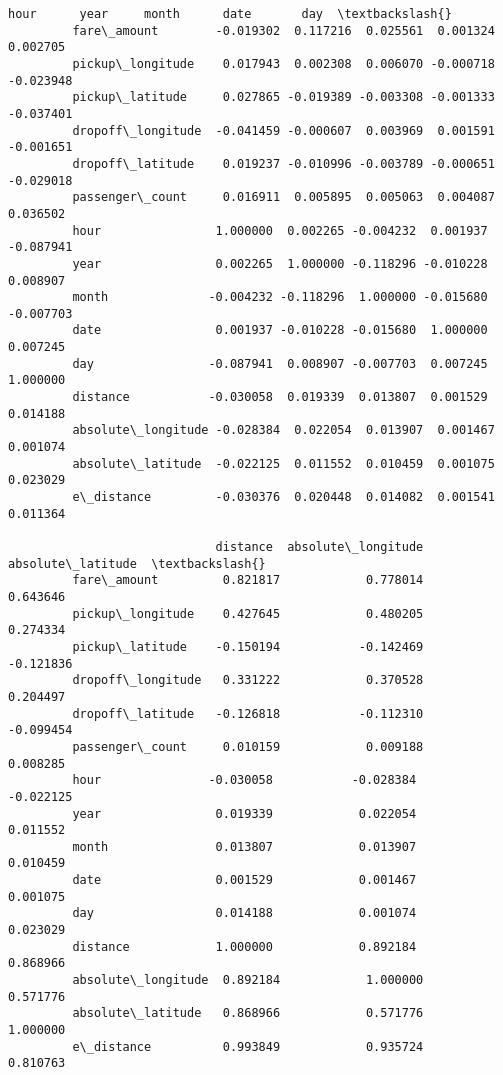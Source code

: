 \documentclass[11pt]{article}
\begin{document}
\begin{Verbatim}[commandchars=\\\{\}]
                                 hour      year     month      date       day  \textbackslash{}
         fare\_amount        -0.019302  0.117216  0.025561  0.001324  0.002705   
         pickup\_longitude    0.017943  0.002308  0.006070 -0.000718 -0.023948   
         pickup\_latitude     0.027865 -0.019389 -0.003308 -0.001333 -0.037401   
         dropoff\_longitude  -0.041459 -0.000607  0.003969  0.001591 -0.001651   
         dropoff\_latitude    0.019237 -0.010996 -0.003789 -0.000651 -0.029018   
         passenger\_count     0.016911  0.005895  0.005063  0.004087  0.036502   
         hour                1.000000  0.002265 -0.004232  0.001937 -0.087941   
         year                0.002265  1.000000 -0.118296 -0.010228  0.008907   
         month              -0.004232 -0.118296  1.000000 -0.015680 -0.007703   
         date                0.001937 -0.010228 -0.015680  1.000000  0.007245   
         day                -0.087941  0.008907 -0.007703  0.007245  1.000000   
         distance           -0.030058  0.019339  0.013807  0.001529  0.014188   
         absolute\_longitude -0.028384  0.022054  0.013907  0.001467  0.001074   
         absolute\_latitude  -0.022125  0.011552  0.010459  0.001075  0.023029   
         e\_distance         -0.030376  0.020448  0.014082  0.001541  0.011364   
         
                             distance  absolute\_longitude  absolute\_latitude  \textbackslash{}
         fare\_amount         0.821817            0.778014           0.643646   
         pickup\_longitude    0.427645            0.480205           0.274334   
         pickup\_latitude    -0.150194           -0.142469          -0.121836   
         dropoff\_longitude   0.331222            0.370528           0.204497   
         dropoff\_latitude   -0.126818           -0.112310          -0.099454   
         passenger\_count     0.010159            0.009188           0.008285   
         hour               -0.030058           -0.028384          -0.022125   
         year                0.019339            0.022054           0.011552   
         month               0.013807            0.013907           0.010459   
         date                0.001529            0.001467           0.001075   
         day                 0.014188            0.001074           0.023029   
         distance            1.000000            0.892184           0.868966   
         absolute\_longitude  0.892184            1.000000           0.571776   
         absolute\_latitude   0.868966            0.571776           1.000000   
         e\_distance          0.993849            0.935724           0.810763   
         

\end{Verbatim}
\end{document}
